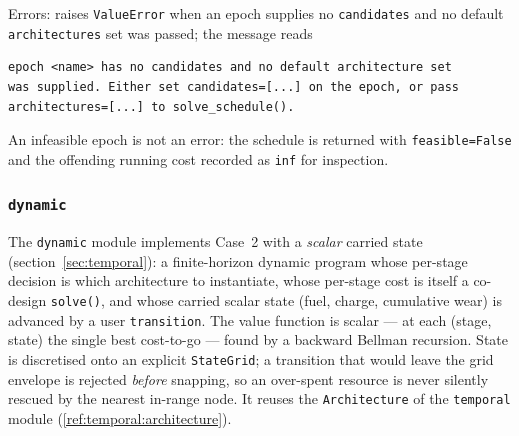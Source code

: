 \documentclass[11pt,a4paper]{article}
\begin{document}
Errors: raises \texttt{ValueError} when an epoch supplies no
\texttt{candidates} and no default \texttt{architectures} set was passed; the
message reads
\begin{lstlisting}[language={},numbers=none,keywordstyle={}]
epoch <name> has no candidates and no default architecture set
was supplied. Either set candidates=[...] on the epoch, or pass
architectures=[...] to solve_schedule().
\end{lstlisting}
An infeasible epoch is not an error: the schedule is returned with
\texttt{feasible=False} and the offending running cost recorded as
\texttt{inf} for inspection.

\subsubsection{\texttt{dynamic}}\label{ref:dynamic}

The \texttt{dynamic} module implements Case~2 with a \emph{scalar} carried
state (section~\ref{sec:temporal}): a finite-horizon dynamic program whose
per-stage decision is which architecture to instantiate, whose per-stage
cost is itself a co-design \texttt{solve()}, and whose carried scalar state
(fuel, charge, cumulative wear) is advanced by a user \texttt{transition}.
The value function is scalar --- at each (stage, state) the single best
cost-to-go --- found by a backward Bellman recursion. State is discretised
onto an explicit \texttt{StateGrid}; a transition that would leave the grid
envelope is rejected \emph{before} snapping, so an over-spent resource is
never silently rescued by the nearest in-range node. It reuses the
\texttt{Architecture} of the \texttt{temporal} module
(\ref{ref:temporal:architecture}).
\end{document}
